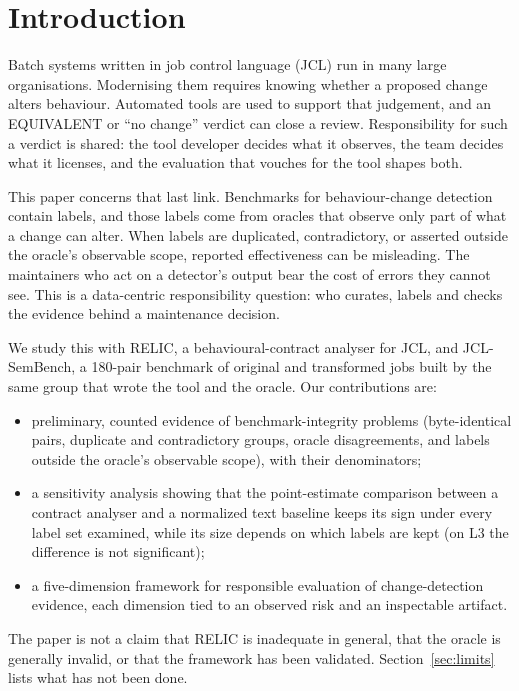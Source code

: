 \documentclass[conference]{IEEEtran}
\begin{document}
\section{Introduction}
Batch systems written in job control language (JCL) run in many large organisations. Modernising them requires knowing whether a proposed change alters behaviour. Automated tools are used to support that judgement, and an EQUIVALENT or ``no change'' verdict can close a review. Responsibility for such a verdict is shared: the tool developer decides what it observes, the team decides what it licenses, and the evaluation that vouches for the tool shapes both.

This paper concerns that last link. Benchmarks for behaviour-change detection contain labels, and those labels come from oracles that observe only part of what a change can alter. When labels are duplicated, contradictory, or asserted outside the oracle's observable scope, reported effectiveness can be misleading. The maintainers who act on a detector's output bear the cost of errors they cannot see. This is a data-centric responsibility question: who curates, labels and checks the evidence behind a maintenance decision.

We study this with RELIC, a behavioural-contract analyser for JCL, and JCL-SemBench, a 180-pair benchmark of original and transformed jobs built by the same group that wrote the tool and the oracle. Our contributions are:
\begin{itemize}
\item preliminary, counted evidence of benchmark-integrity problems (byte-identical pairs, duplicate and contradictory groups, oracle disagreements, and labels outside the oracle's observable scope), with their denominators;
\item a sensitivity analysis showing that the point-estimate comparison between a contract analyser and a normalized text baseline keeps its sign under every label set examined, while its size depends on which labels are kept (on L3 the difference is not significant);
\item a five-dimension framework for responsible evaluation of change-detection evidence, each dimension tied to an observed risk and an inspectable artifact.
\end{itemize}
The paper is not a claim that RELIC is inadequate in general, that the oracle is generally invalid, or that the framework has been validated. Section~\ref{sec:limits} lists what has not been done.
\end{document}
